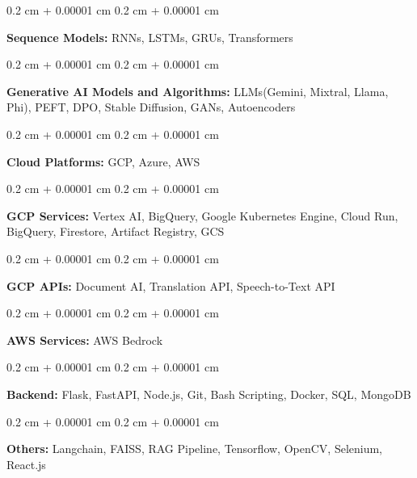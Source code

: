 \documentclass[10pt, letterpaper]{article}
\newenvironment{onecolentry}{
    \begin{adjustwidth}{
        0.2 cm + 0.00001 cm
    }{
        0.2 cm + 0.00001 cm
    }
}{
    \end{adjustwidth}
} %
\begin{document}
        \vspace{0.1 cm}
        \begin{onecolentry}
            \textbf{Sequence Models:} RNNs, LSTMs, GRUs, Transformers
        \end{onecolentry}
        \vspace{0.1 cm}
        \begin{onecolentry}
            \textbf{Generative AI Models and Algorithms:} LLMs(Gemini, Mixtral, Llama, Phi), PEFT, DPO, Stable Diffusion, GANs, Autoencoders
        \end{onecolentry}
        \vspace{0.1 cm}
        \begin{onecolentry}
            \textbf{Cloud Platforms:} GCP, Azure, AWS
        \end{onecolentry}
        \vspace{0.1 cm}
        \begin{onecolentry}
            \textbf{GCP Services:} Vertex AI, BigQuery, Google Kubernetes Engine, Cloud Run, BigQuery, Firestore, Artifact Registry, GCS
        \end{onecolentry}
        \vspace{0.1 cm}
        \begin{onecolentry}
            \textbf{GCP APIs:} Document AI, Translation API, Speech-to-Text API
        \end{onecolentry}
        \vspace{0.1 cm}
        \begin{onecolentry}
            \textbf{AWS Services:} AWS Bedrock
        \end{onecolentry}
        \vspace{0.1 cm}
        \begin{onecolentry}
            \textbf{Backend:} Flask, FastAPI, Node.js, Git, Bash Scripting, Docker, SQL, MongoDB
        \end{onecolentry}
        \vspace{0.1 cm}
        \begin{onecolentry}
            \textbf{Others:} Langchain, FAISS, RAG Pipeline, Tensorflow, OpenCV, Selenium, React.js
        \end{onecolentry}

    \vspace{0.2 cm}
\end{document}
